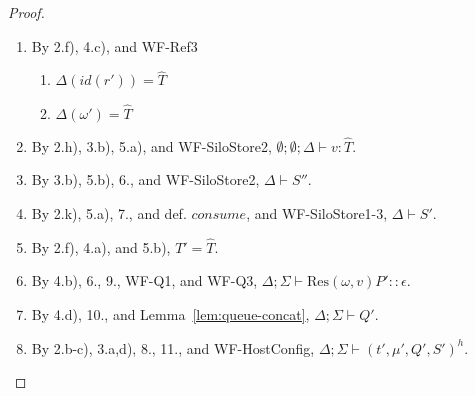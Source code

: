 \documentclass{article}
\theoremstyle{definition}
\newcommand{\Res}[2]{\text{Res}(#1, #2)}
\begin{document}
\begin{proof}
\begin{itemize}
\begin{enumerate}
\item By 2.f), 4.c), and WF-Ref3
  \begin{enumerate}[label=(\alph*)]
  \item $\Delta(id(r')) = \hat{T}$
  \item $\Delta(\omega') = \hat{T}$
  \end{enumerate}
\item By 2.h), 3.b), 5.a), and WF-SiloStore2, $\emptyset ; \emptyset ; \Delta \vdash v : \hat{T}$.
\item By 3.b), 5.b), 6., and WF-SiloStore2, $\Delta \vdash S''$.
\item By 2.k), 5.a), 7., and def. $consume$, and WF-SiloStore1-3, $\Delta \vdash S'$.
\item By 2.f), 4.a), and 5.b), $T' = \hat{T}$.
\item By 4.b), 6., 9., WF-Q1, and WF-Q3, $\Delta ; \Sigma \vdash {\Res \omega v {P'}} :: \epsilon$.
\item By 4.d), 10., and Lemma~\ref{lem:queue-concat}, $\Delta ; \Sigma \vdash Q'$.
\item By 2.b-c), 3.a,d), 8., 11., and WF-HostConfig, $\Delta ; \Sigma \vdash (t', \mu', Q', S')^h$.
\end{enumerate}


\end{itemize}
\end{proof}
\end{document}
